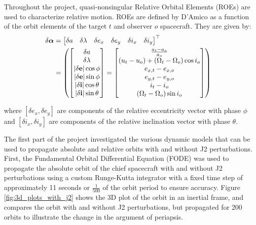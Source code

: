 Throughout the project, quasi-nonsingular Relative Orbital Elements (ROEs) are used to characterize relative motion. ROEs are defined by D'Amico as a function of the orbit elements of the target $t$ and observer $o$ spacecraft.\cite{damicothesis} They are given by:
\begin{align}
\delta \boldsymbol{\alpha} &= 
\begin{bmatrix} \label{eq:quasi_nonsign_roe}
\delta a & \delta \lambda & \delta e_x & \delta e_y & \delta i_x & \delta i_y
\end{bmatrix}^\top \notag \\
&= 
\left( 
\begin{bmatrix}
\delta a \\
\delta \lambda \\
|\delta\mathbf{e}| \cos \phi \\
|\delta\mathbf{e}| \sin \phi \\
|\delta\mathbf{i}| \cos \theta \\
|\delta\mathbf{i}| \sin \theta
\end{bmatrix}
= 
\begin{bmatrix}
\frac{a_t - a_o}{a_o} \\
(u_t - u_o) + (\Omega_t - \Omega_o) \cos i_o \\
e_{x,t} - e_{x,o} \\
e_{y,t} - e_{y,o} \\
i_t - i_o \\
(\Omega_t - \Omega_o) \sin i_o
\end{bmatrix}
\right)
\end{align}

where $[\delta e_x, \delta e_y]$ are components of the relative eccentricity vector with phase $\phi$ and $[\delta i_x, \delta i_y]$ are components of the relative inclination vector with phase $\theta$.

The first part of the project investigated the various dynamic models that can be used to propagate absolute and relative orbits with and without J2 perturbations. First, the Fundamental Orbital Differential Equation (FODE) was used to propagate the absolute orbit of the chief spacecraft with and without J2 perturbations using a custom Runge-Kutta integrator with a fixed time step of approximately 11 seconds or $\frac{1}{500}$ of the orbit period to ensure accuracy. Figure \ref{fig:3d_plots_with_j2} shows the 3D plot of the orbit in an inertial frame, and compares the orbit with and without J2 perturbations, but propagated for 200 orbits to illustrate the change in the argument of periapsis. 

